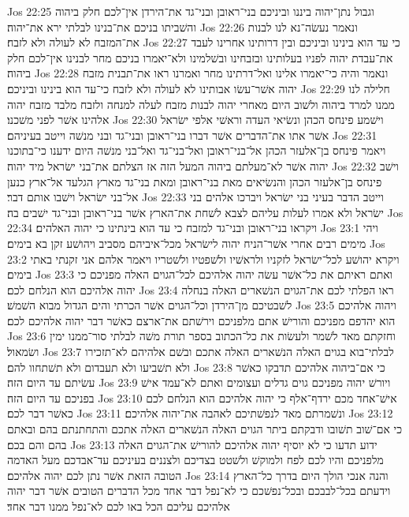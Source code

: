 Jos 22:25  וגבול נתן־יהוה ביננו וביניכם בני־ראובן ובני־גד את־הירדן אין־לכם חלק ביהוה והשׁביתו בניכם את־בנינו לבלתי ירא את־יהוה׃
Jos 22:26  ונאמר נעשׂה־נא לנו לבנות את־המזבח לא לעולה ולא לזבח׃
Jos 22:27  כי עד הוא בינינו וביניכם ובין דרותינו אחרינו לעבד את־עבדת יהוה לפניו בעלותינו ובזבחינו ובשׁלמינו ולא־יאמרו בניכם מחר לבנינו אין־לכם חלק ביהוה׃
Jos 22:28  ונאמר והיה כי־יאמרו אלינו ואל־דרתינו מחר ואמרנו ראו את־תבנית מזבח יהוה אשׁר־עשׂו אבותינו לא לעולה ולא לזבח כי־עד הוא בינינו וביניכם׃
Jos 22:29  חלילה לנו ממנו למרד ביהוה ולשׁוב היום מאחרי יהוה לבנות מזבח לעלה למנחה ולזבח מלבד מזבח יהוה אלהינו אשׁר לפני משׁכנו׃
Jos 22:30  וישׁמע פינחס הכהן ונשׂיאי העדה וראשׁי אלפי ישׂראל אשׁר אתו את־הדברים אשׁר דברו בני־ראובן ובני־גד ובני מנשׁה וייטב בעיניהם׃
Jos 22:31  ויאמר פינחס בן־אלעזר הכהן אל־בני־ראובן ואל־בני־גד ואל־בני מנשׁה היום ידענו כי־בתוכנו יהוה אשׁר לא־מעלתם ביהוה המעל הזה אז הצלתם את־בני ישׂראל מיד יהוה׃
Jos 22:32  וישׁב פינחס בן־אלעזר הכהן והנשׂיאים מאת בני־ראובן ומאת בני־גד מארץ הגלעד אל־ארץ כנען אל־בני ישׂראל וישׁבו אותם דבר׃
Jos 22:33  וייטב הדבר בעיני בני ישׂראל ויברכו אלהים בני ישׂראל ולא אמרו לעלות עליהם לצבא לשׁחת את־הארץ אשׁר בני־ראובן ובני־גד ישׁבים בה׃
Jos 22:34  ויקראו בני־ראובן ובני־גד למזבח כי עד הוא בינתינו כי יהוה האלהים׃
Jos 23:1  ויהי מימים רבים אחרי אשׁר־הניח יהוה לישׂראל מכל־איביהם מסביב ויהושׁע זקן בא בימים׃
Jos 23:2  ויקרא יהושׁע לכל־ישׂראל לזקניו ולראשׁיו ולשׁפטיו ולשׁטריו ויאמר אלהם אני זקנתי באתי בימים׃
Jos 23:3  ואתם ראיתם את כל־אשׁר עשׂה יהוה אלהיכם לכל־הגוים האלה מפניכם כי יהוה אלהיכם הוא הנלחם לכם׃
Jos 23:4  ראו הפלתי לכם את־הגוים הנשׁארים האלה בנחלה לשׁבטיכם מן־הירדן וכל־הגוים אשׁר הכרתי והים הגדול מבוא השׁמשׁ׃
Jos 23:5  ויהוה אלהיכם הוא יהדפם מפניכם והורישׁ אתם מלפניכם וירשׁתם את־ארצם כאשׁר דבר יהוה אלהיכם לכם׃
Jos 23:6  וחזקתם מאד לשׁמר ולעשׂות את כל־הכתוב בספר תורת משׁה לבלתי סור־ממנו ימין ושׂמאול׃
Jos 23:7  לבלתי־בוא בגוים האלה הנשׁארים האלה אתכם ובשׁם אלהיהם לא־תזכירו ולא תשׁביעו ולא תעבדום ולא תשׁתחוו להם׃
Jos 23:8  כי אם־ביהוה אלהיכם תדבקו כאשׁר עשׂיתם עד היום הזה׃
Jos 23:9  ויורשׁ יהוה מפניכם גוים גדלים ועצומים ואתם לא־עמד אישׁ בפניכם עד היום הזה׃
Jos 23:10  אישׁ־אחד מכם ירדף־אלף כי יהוה אלהיכם הוא הנלחם לכם כאשׁר דבר לכם׃
Jos 23:11  ונשׁמרתם מאד לנפשׁתיכם לאהבה את־יהוה אלהיכם׃
Jos 23:12  כי אם־שׁוב תשׁובו ודבקתם ביתר הגוים האלה הנשׁארים האלה אתכם והתחתנתם בהם ובאתם בהם והם בכם׃
Jos 23:13  ידוע תדעו כי לא יוסיף יהוה אלהיכם להורישׁ את־הגוים האלה מלפניכם והיו לכם לפח ולמוקשׁ ולשׁטט בצדיכם ולצננים בעיניכם עד־אבדכם מעל האדמה הטובה הזאת אשׁר נתן לכם יהוה אלהיכם׃
Jos 23:14  והנה אנכי הולך היום בדרך כל־הארץ וידעתם בכל־לבבכם ובכל־נפשׁכם כי לא־נפל דבר אחד מכל הדברים הטובים אשׁר דבר יהוה אלהיכם עליכם הכל באו לכם לא־נפל ממנו דבר אחד׃
